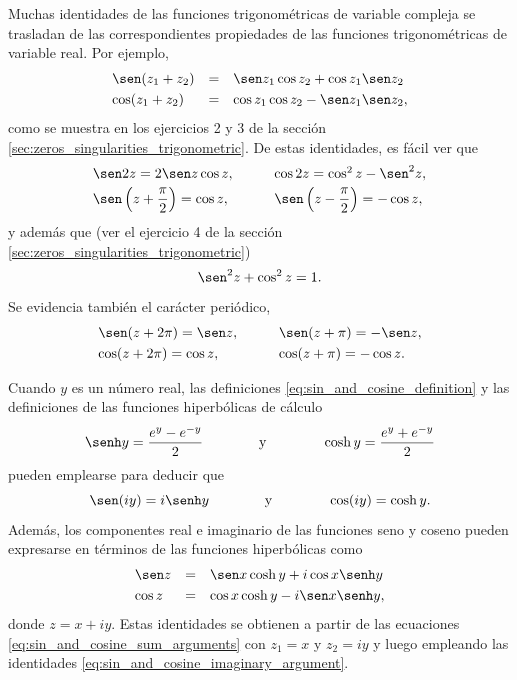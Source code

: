 \documentclass[a4paper]{report}
\begin{document}
Muchas identidades de las funciones trigonométricas de variable compleja se trasladan de las correspondientes propiedades de las funciones trigonométricas de variable real. Por ejemplo,
\begin{equation}\label{eq:sin_and_cosine_sum_arguments}
 \begin{array}{lll}
  \sen(z_1+z_2)&=&\sen z_1\cos z_2+\cos z_1\sen z_2\\[\smallskipamount]
  \cos(z_1+z_2)&=&\cos z_1\cos z_2-\sen z_1\sen z_2,
 \end{array} 
\end{equation}
como se muestra en los ejercicios 2 y 3 de la sección \ref{sec:zeros_singularities_trigonometric}. De estas identidades, es fácil ver que 
\[
 \begin{array}{ll}
  \sen2z=2\sen z\cos z, &\qquad\cos2z=\cos^2z-\sen^2 z,\\[\smallskipamount]
  \sen\left(z+\dfrac{\pi}{2}\right)=\cos z, &\qquad \sen\left(z-\dfrac{\pi}{2}\right)=-\cos z, 
 \end{array}
\]
y además que (ver el ejercicio 4 de la sección \ref{sec:zeros_singularities_trigonometric})
\begin{equation}\label{eq:sin_and_cosine_square_sum}
 \sen^2z+\cos^2z=1. 
\end{equation}
Se evidencia también el carácter periódico,  
\begin{equation}\label{eq:sin_and_cosine_periodicity}
 \begin{array}{ll}
  \sen(z+2\pi)=\sen z, &\qquad\sen(z+\pi)=-\sen z,\\[\smallskipamount]
  \cos(z+2\pi)=\cos z, &\qquad\cos(z+\pi)=-\cos z. 
 \end{array} 
\end{equation}

Cuando \(y\) es un número real, las definiciones \ref{eq:sin_and_cosine_definition} y las definiciones de las funciones hiperbólicas de cálculo
\begin{equation}\label{eq:hyperbolic_functions_definition_real}
 \senh y=\frac{e^y-e^{-y}}{2}
 \qquad\qquad\textrm{y}\qquad\qquad
 \cosh y=\frac{e^y+e^{-y}}{2} 
\end{equation}
pueden emplearse para deducir que 
\begin{equation}\label{eq:sin_and_cosine_imaginary_argument}
 \sen(iy)=i\senh y
 \qquad\qquad\textrm{y}\qquad\qquad
 \cos(iy)=\cosh y. 
\end{equation}
Además, los componentes real e imaginario de las funciones seno y coseno pueden expresarse en términos de las funciones hiperbólicas como
\begin{equation}\label{eq:sin_and_cosine_components}
 \begin{array}{lll}
  \sen z&=&\sen x\cosh y+i\cos x\senh y\\[\smallskipamount]
  \cos z&=&\cos x\cosh y-i\sen x\senh y,
 \end{array} 
\end{equation}
donde \(z=x+iy\). Estas identidades se obtienen a partir de las ecuaciones \ref{eq:sin_and_cosine_sum_arguments} con \(z_1=x\) y \(z_2=iy\) y luego empleando las identidades \ref{eq:sin_and_cosine_imaginary_argument}.
\end{document}

